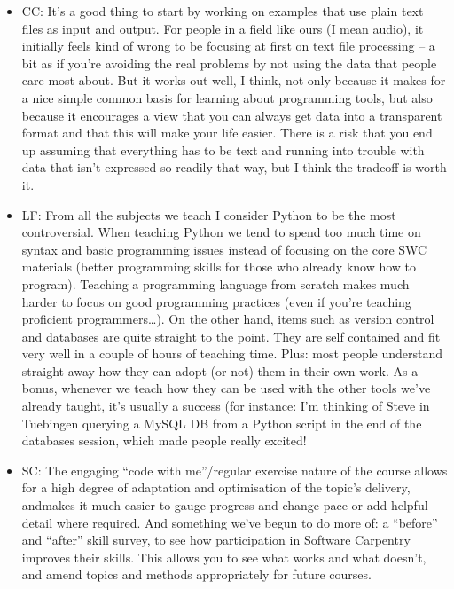 \documentclass{article}
\begin{document}
\begin{itemize}
  \item CC: It's a good thing to start by working on examples that use
    plain text files as input and output.  For people in a field like
    ours (I mean audio), it initially feels kind of wrong to be
    focusing at first on text file processing -- a bit as if you're
    avoiding the real problems by not using the data that people care
    most about. But it works out well, I think, not only because it
    makes for a nice simple common basis for learning about
    programming tools, but also because it encourages a view that you
    can always get data into a transparent format and that this will
    make your life easier.  There is a risk that you end up assuming
    that everything has to be text and running into trouble with data
    that isn't expressed so readily that way, but I think the tradeoff
    is worth it.

  \item LF: From all the subjects we teach I consider Python to be the
    most controversial. When teaching Python we tend to spend too much
    time on syntax and basic programming issues instead of focusing on
    the core SWC materials (better programming skills for those who
    already know how to program). Teaching a programming language from
    scratch makes much harder to focus on good programming practices
    (even if you're teaching proficient programmers{\ldots}).  On the
    other hand, items such as version control and databases are quite
    straight to the point. They are self contained and fit very well
    in a couple of hours of teaching time. Plus: most people
    understand straight away how they can adopt (or not) them in their
    own work. As a bonus, whenever we teach how they can be used with
    the other tools we've already taught, it's usually a success (for
    instance: I'm thinking of Steve in Tuebingen querying a MySQL DB
    from a Python script in the end of the databases session, which
    made people really excited!

  \item SC: The engaging ``code with me''/regular exercise nature of
    the course allows for a high degree of adaptation and optimisation
    of the topic's delivery, andmakes it much easier to gauge progress
    and change pace or add helpful detail where required.  And
    something we've begun to do more of: a ``before'' and ``after''
    skill survey, to see how participation in Software Carpentry
    improves their skills. This allows you to see what works and what
    doesn't, and amend topics and methods appropriately for future
    courses.

\end{itemize}
\end{document}
